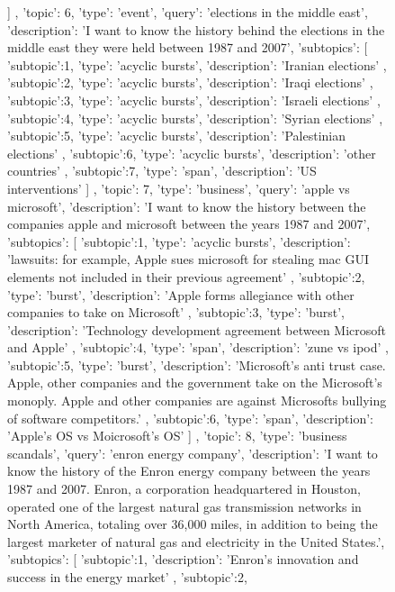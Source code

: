 \begin{figure}[ht]
{\begin{minipage}{\textwidth}
{		]
	},
	{	
		'topic': 6,
		'type': 'event',
		'query': 'elections in the middle east',
		'description': 'I want to know the history behind the elections in the middle east they were held between 1987 and 2007',
		'subtopics': [
			{
				'subtopic':1,
				'type': 'acyclic bursts',
				'description': 'Iranian elections'
			},
			{
				'subtopic':2,
				'type': 'acyclic bursts',
				'description': 'Iraqi elections'
			},
			{
				'subtopic':3,
				'type': 'acyclic bursts',
				'description': 'Israeli elections'
			},
			{
				'subtopic':4,
				'type': 'acyclic bursts',
				'description': 'Syrian elections'
			},
			{
				'subtopic':5,
				'type': 'acyclic bursts',
				'description': 'Palestinian elections'
			},
			{
				'subtopic':6,
				'type': 'acyclic bursts',
				'description': 'other countries'
			},
			{
				'subtopic':7,
				'type': 'span',
				'description': 'US interventions'
			}
		]
	},
	{	
		'topic': 7,
		'type': 'business',
		'query': 'apple vs microsoft',
		'description': 'I want to know the history between the companies apple and microsoft between the years 1987 and 2007',
		'subtopics': [
			{
				'subtopic':1,
				'type': 'acyclic bursts',
				'description': 'lawsuits: for example, Apple sues microsoft for stealing mac GUI elements not included in their previous agreement'
			},
			{
				'subtopic':2,
				'type': 'burst',
				'description': 'Apple forms allegiance with other companies to take on Microsoft'
			},
			{
				'subtopic':3,
				'type': 'burst',
				'description': 'Technology development agreement between Microsoft and Apple'
			},
			{
				'subtopic':4,
				'type': 'span',
				'description': 'zune vs ipod'
			},
			{
				'subtopic':5,
				'type': 'burst',
				'description': 'Microsoft's anti trust case. Apple, other companies and the government take on the Microsoft's monoply. Apple and other companies are against Microsofts bullying of software competitors.'
			},
			{
				'subtopic':6,
				'type': 'span',
				'description': 'Apple's OS vs Moicrosoft's OS'
			}
		]
	},
	{	
		'topic': 8,
		'type': 'business scandals',
		'query': 'enron energy company',
		'description': 'I want to know the history of the Enron energy company between the years 1987 and 2007. Enron, a corporation headquartered in Houston, operated one of the largest natural gas transmission networks in North America, totaling over 36,000 miles, in addition to being the largest marketer of natural gas and electricity in the United States.',
		'subtopics': [
			{
				'subtopic':1,
				'description': 'Enron's innovation and success in the energy market'
			},
			{
				'subtopic':2,
}}
\end{minipage}}
\end{figure}
